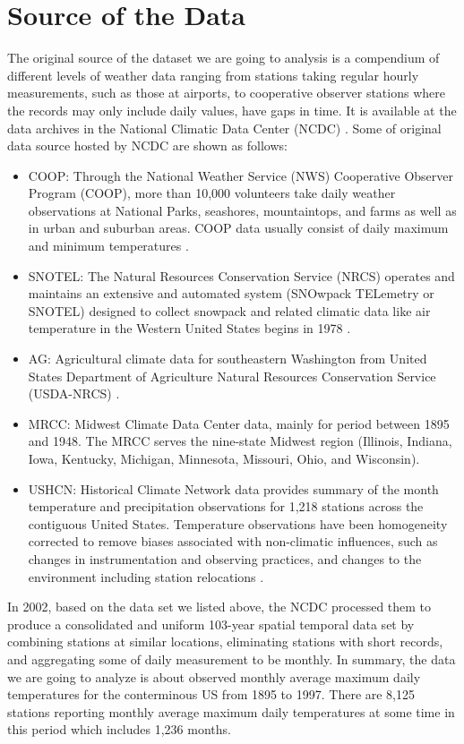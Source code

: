 \section{Source of the Data}

The original source of the dataset we are going to analysis is a compendium of 
different levels of weather data ranging from stations taking regular hourly 
measurements, such as those at airports, to cooperative observer stations where 
the records may only include daily values, have gaps in time. It is available at 
the data archives in the National Climatic Data Center (NCDC) \cite{NCEI}.
Some of original data source hosted by NCDC \cite{NCEI} are shown as follows:

\begin{itemize}
  \item COOP:
    Through the National Weather Service (NWS) Cooperative Observer Program 
    (COOP), more than 10,000 volunteers take daily weather observations at 
    National Parks, seashores, mountaintops, and farms as well as in urban and 
    suburban areas. COOP data usually consist of daily maximum and minimum 
    temperatures \cite{COOP}.
  \item SNOTEL:
    The Natural Resources Conservation Service (NRCS) operates and maintains an 
    extensive and automated system (SNOwpack TELemetry or SNOTEL) designed to
    collect snowpack and related climatic data like air temperature in the Western
    United States begins in 1978 \cite{SNOTEL}.
  \item AG:
    Agricultural climate data for southeastern Washington from United States
    Department of Agriculture Natural Resources Conservation Service (USDA-NRCS) 
    \cite{USDA}.
  \item MRCC:
    Midwest Climate Data Center data, mainly for period between 1895 and 1948. 
    The MRCC \cite{MRCC} serves the nine-state Midwest region (Illinois, Indiana, 
    Iowa, Kentucky, Michigan, Minnesota, Missouri, Ohio, and Wisconsin).
  \item USHCN:
    Historical Climate Network data provides summary of the month temperature and 
    precipitation observations for 1,218 stations across the contiguous United 
    States. Temperature observations have been homogeneity corrected to remove 
    biases associated with non-climatic influences, such as changes in 
    instrumentation and observing practices, and changes to the environment 
    including station relocations \cite{USHCN}.
\end{itemize}

In 2002, based on the data set we listed above, the NCDC processed them to 
produce a consolidated and uniform 103-year spatial temporal data set by 
combining stations at similar locations, eliminating stations with short records, 
and aggregating some of daily measurement to be monthly. In summary, the data we 
are going to analyze is about observed monthly average maximum daily temperatures 
for the conterminous US from 1895 to 1997. There are 8,125 stations reporting 
monthly average maximum daily temperatures at some time in this period which 
includes 1,236 months. 